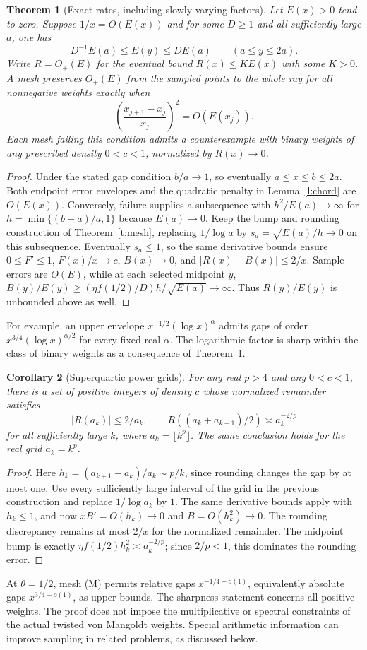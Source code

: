 \documentclass[11pt]{article}
\newtheorem{theorem}{Theorem}
\newtheorem{corollary}[theorem]{Corollary}
\begin{document}
\begin{theorem}[Exact rates, including slowly varying factors]\label{t:gauge}
Let $E(x)>0$ tend to zero. Suppose $1/x=O(E(x))$ and for some $D\ge1$ and all sufficiently large $a$, one has
\[
 D^{-1}E(a)\le E(y)\le DE(a)\qquad(a\le y\le2a).
\]
Write $R=O_+(E)$ for the eventual bound $R(x)\le K E(x)$ with some $K>0$. A mesh preserves $O_+(E)$ from the sampled points to the whole ray for all nonnegative weights exactly when
\[
 \left(\frac{x_{j+1}-x_j}{x_j}\right)^2=O(E(x_j)).
\]
Each mesh failing this condition admits a counterexample with binary weights of any prescribed density $0<c<1$, normalized by $R(x)\to0$.
\end{theorem}
\begin{proof}
Under the stated gap condition $b/a\to1$, so eventually $a\le x\le b\le2a$. Both endpoint error envelopes and the quadratic penalty in Lemma~\ref{l:chord} are $O(E(x))$. Conversely, failure supplies a subsequence with $h^2/E(a)\to\infty$ for $h=\min\{(b-a)/a,1\}$ because $E(a)\to0$. Keep the bump and rounding construction of Theorem~\ref{t:mesh}, replacing $1/\log a$ by $s_a=\sqrt{E(a)}/h\to0$ on this subsequence. Eventually $s_a\le1$, so the same derivative bounds ensure $0\le F'\le1$, $F(x)/x\to c$, $B(x)\to0$, and $|R(x)-B(x)|\le2/x$. Sample errors are $O(E)$, while at each selected midpoint $y$, $B(y)/E(y)\ge (\eta f(1/2)/D)h/\sqrt{E(a)}\to\infty$. Thus $R(y)/E(y)$ is unbounded above as well.
\end{proof}
For example, an upper envelope $x^{-1/2}(\log x)^\alpha$ admits gaps of order $x^{3/4}(\log x)^{\alpha/2}$ for every fixed real $\alpha$. The logarithmic factor is sharp within the class of binary weights as a consequence of Theorem~\ref{t:gauge}.

\begin{corollary}[Superquartic power grids]\label{c:sharp}
For any real $p>4$ and any $0<c<1$, there is a set of positive integers of density $c$ whose normalized remainder satisfies
\[
 |R(a_k)|\le2/a_k,\qquad R((a_k+a_{k+1})/2)\asymp a_k^{-2/p}
\]
for all sufficiently large $k$, where $a_k=\lfloor k^p\rfloor$. The same conclusion holds for the real grid $a_k=k^p$.
\end{corollary}
\begin{proof}
Here $h_k=(a_{k+1}-a_k)/a_k\sim p/k$, since rounding changes the gap by at most one. Use every sufficiently large interval of the grid in the previous construction and replace $1/\log a_k$ by $1$. The same derivative bounds apply with $h_k\le1$, and now $xB'=O(h_k)\to0$ and $B=O(h_k^2)\to0$. The rounding discrepancy remains at most $2/x$ for the normalized remainder. The midpoint bump is exactly $\eta f(1/2)h_k^2\asymp a_k^{-2/p}$; since $2/p<1$, this dominates the rounding error.
\end{proof}
At $\theta=1/2$, mesh (M) permits relative gaps $x^{-1/4+o(1)}$, equivalently absolute gaps $x^{3/4+o(1)}$, as upper bounds. The sharpness statement concerns all positive weights. The proof does not impose the multiplicative or spectral constraints of the actual twisted von Mangoldt weights. Special arithmetic information can improve sampling in related problems, as discussed below.
\end{document}
